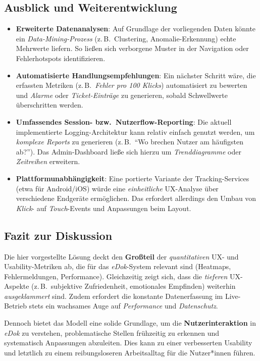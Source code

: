\documentclass[12pt,oneside]{article}
\begin{document}
\subsection{Ausblick und Weiterentwicklung}
\begin{itemize}
    \item \textbf{Erweiterte Datenanalysen}:
    Auf Grundlage der vorliegenden Daten könnte ein \emph{Data-Mining-Prozess} (z.\,B.\ Clustering, Anomalie-Erkennung) echte Mehrwerte liefern. So ließen sich verborgene Muster in der Navigation oder Fehlerhotspots identifizieren.
    \item \textbf{Automatisierte Handlungsempfehlungen}:
    Ein nächster Schritt wäre, die erfassten Metriken (z.\,B.\ \emph{Fehler pro 100 Klicks}) automatisiert zu bewerten und \emph{Alarme} oder \emph{Ticket-Einträge} zu generieren, sobald Schwellwerte überschritten werden. 
    \item \textbf{Umfassendes Session- bzw.\ Nutzerflow-Reporting}:
    Die aktuell implementierte Logging-Architektur kann relativ einfach genutzt werden, um \emph{komplexe Reports} zu generieren (z.\,B.\ \enquote{Wo brechen Nutzer am häufigsten ab?}). Das Admin-Dashboard ließe sich hierzu um \emph{Trenddiagramme} oder \emph{Zeitreihen} erweitern.
    \item \textbf{Plattformunabhängigkeit}:
    Eine portierte Variante der Tracking-Services (etwa für Android/iOS) würde eine \emph{einheitliche} UX-Analyse über verschiedene Endgeräte ermöglichen. Das erfordert allerdings den Umbau von \emph{Klick}- auf \emph{Touch}-Events und Anpassungen beim Layout.
\end{itemize}

\subsection{Fazit zur Diskussion}
Die hier vorgestellte Lösung deckt den \textbf{Großteil} der \emph{quantitativen} UX- und Usability-Metriken ab, die für das \textit{eDok}-System relevant sind (Heatmaps, Fehlermeldungen, Performance). Gleichzeitig zeigt sich, dass die \emph{tieferen} UX-Aspekte (z.\,B.\ subjektive Zufriedenheit, emotionales Empfinden) weiterhin \emph{ausgeklammert} sind. Zudem erfordert die konstante Datenerfassung im Live-Betrieb stets ein wachsames Auge auf \emph{Performance} und \emph{Datenschutz}. 

Dennoch bietet das Modell eine solide Grundlage, um die \textbf{Nutzerinteraktion} in \textit{eDok} zu verstehen, problematische Stellen frühzeitig zu erkennen und systematisch Anpassungen abzuleiten. Dies kann zu einer verbesserten Usability und letztlich zu einem reibungsloseren Arbeitsalltag für die Nutzer*innen führen. 


\printbibliography
 

\end{document}
